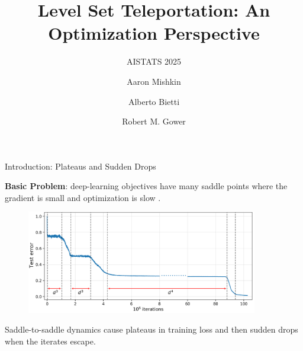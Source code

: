 \documentclass[usenames,dvipsnames,mathserif,notheorems]{beamer}
\title{Level Set Teleportation: An Optimization Perspective}
\subtitle{\vspace{1ex} AISTATS 2025}
\author{Aaron Mishkin \and Alberto Bietti \and Robert M. Gower}
\date{}
\newcommand{\bad}[1]{\textcolor{bad}{#1}}
\newcommand{\good}[1]{\textcolor{good}{#1}}
\begin{document}
\maketitle

\begin{frame}{Introduction: Plateaus and Sudden Drops}

    \textbf{Basic Problem}: deep-learning objectives have many \bad{saddle points}
    where the gradient is small and optimization is slow \citep{fukumizu2000local}.

    \pause

    \begin{figure}[]
        \centering
        \includegraphics[width=0.90\textwidth]{assets/SaddleToSaddleSimu.pdf}
    \end{figure}

    \pause

    Saddle-to-saddle dynamics \citep{pesme2023saddle, abbe2023saddle} cause
    \bad{plateaus} in training loss and then
    \good{sudden drops} when the iterates escape.


\end{frame}
\end{document}
